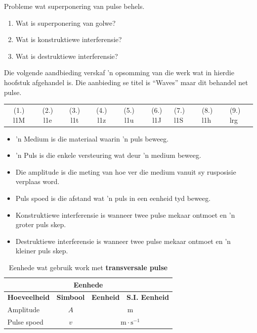 \begin{exercises}{Probleme wat superponering van pulse behels.}
\begin{enumerate}[noitemsep, label=\textbf{\arabic*}. ]
 \label{m38802*uid62}\item Wat is superponering van golwe?\newline
\label{m38802*uid64}\item Wat is konstruktiewe interferensie?\newline
\label{m38802*uid65}\item Wat is destruktiewe interferensie?\newline
        \end{enumerate}
\label{m38802*fs-id1165499443114} Die volgende aandbieding verskaf 'n opsomming van die werk wat in hierdie hoofstuk afgehandel is. Die aanbieding se titel is ``Waves'' maar dit behandel net pulse. 
\par 
  \label{m38802*eip-812}
\practiceinfo
 \par \begin{tabular}[h]{cccccc}
 (1.) l1M  &  (2.) l1e  &  (3.) l1t  &  (4.) l1z  &  (5.) l1u  &  (6.) l1J  &  (7.) l1S  &  (8.) l1h  &  (9.) lrg  & \end{tabular}

\end{exercises}
            \summary
            \nopagebreak
            \label{m38802*eip-404}\begin{itemize}[noitemsep]
            \item 'n Medium is die materiaal waarin 'n puls beweeg.
	    \item 'n Puls is die enkele versteuring wat deur 'n medium beweeg. 
	    \item Die amplitude is die meting van hoe ver die medium vanuit sy rusposisie verplaas word. 
	    \item Puls spoed is die afstand wat 'n puls in een eenheid tyd beweeg.
	    \item Konstruktiewe interferensie is wanneer twee pulse mekaar ontmoet en 'n groter puls skep.
	    \item Destruktiewe interferensie is wanneer twee pulse mekaar ontmoet en 'n kleiner puls skep.
	    \end{itemize}
        \label{m38802*cid9}
\begin{table}[H]
\begin{center}
\begin{tabular}{|l|c|c|c|}\hline \hline 
\multicolumn{4}{|c|}{\textbf{Eenhede}}\\ \hline \hline
\textbf{Hoeveelheid} & \textbf{Simbool} & \textbf{Eenheid} & \textbf{S.I. Eenheid}  \\ \hline
Amplitude & $A$ & \multicolumn{2}{c|}{m} \\ \hline
Pulse spoed & $v$ & \multicolumn{2}{c|}{$\text{m} \cdot \text{s}^{-1}$} \\ \hline
\end{tabular}
\end{center}
\caption{Eenhede wat gebruik work met \textbf{transversale pulse} }
\label{table:electricity::units}
\end{table}

